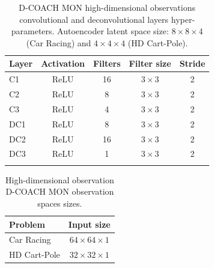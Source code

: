 \begin{table}[H]
\vspace{1cm}
\parbox{\linewidth}{
\centering
\caption[High-dimensional observation D-COACH MON convolutional and deconvolutional layers hyper-parameters]{D-COACH MON high-dimensional observations convolutional and deconvolutional layers hyper-parameters. Autoencoder latent space size: $8\times8\times4$ (Car Racing) and $4\times4\times4$ (HD Cart-Pole).}
\label{table:mon_hypers1}
\begin{tabular}{lcccc}
\textbf{Layer} & \multicolumn{1}{l}{\textbf{Activation}} & \multicolumn{1}{l}{\textbf{Filters}} & \multicolumn{1}{l}{\textbf{Filter size}} & \multicolumn{1}{l}{\textbf{Stride}} \\ \hline \hline
C1             & ReLU                                    & 16                                   & $3\times3$                                    & 2                                   \\ \hline
C2             & ReLU                                    & 8                                    & $3\times3$                                    & 2                                   \\ \hline
C3             & ReLU                                    & 4                                    & $3\times3$                                    & 2                                   \\ \hline
DC1            & ReLU                                    & 8                                    & $3\times3$                                    & 2                                   \\ \hline
DC2            & ReLU                                    & 16                                   & $3\times3$                                    & 2                                   \\ \hline
DC3            & ReLU                                    & 1                                    & $3\times3$                                    & 2                                   \\ \hline
\vspace{0.2cm}
\end{tabular}}
\end{table}

\begin{table}[H]
\centering
\caption{High-dimensional observation D-COACH MON observation spaces sizes.}
\label{table:mon_hypers3}
\begin{tabular}{lc}
\textbf{Problem}     & \textbf{Input size} \\ \hline \hline
Car Racing     & $64\times64\times1$                   \\ \hline
HD Cart-Pole    & $32\times32\times1$  \\ \hline
\end{tabular}
\vspace{1cm}
\end{table}

